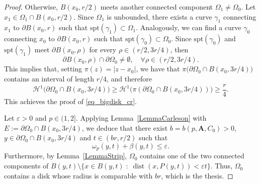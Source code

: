 \documentclass[12pt]{article}
\theoremstyle{definition}
\theoremstyle{remark}
\numberwithin{equation}{section}
\DeclareMathOperator{\dist}{dist}
\newcommand{\dd}{\partial}
\newcommand{\A}{\mathbf{A}}
\newcommand{\spt}{\mathrm{spt}}
\renewcommand{\H}{\mathcal{H}}
\begin{document}
\begin{proof}
    Otherwise, $B(x_0,r/2)$ meets another connected component $\Omega_1\neq\Omega_0$. Let $x_1\in\Omega_1\cap
    B(x_0,r/2)$. Since $\Omega_1$ is unbounded, there exists a curve $\gamma_1$ connecting $x_1$ to $\dd
    B(x_0,r)$ such that $\spt(\gamma_1) \subset \Omega_1$. Analogously, we can find a curve $\gamma_0$ connecting $x_0$
    to $\dd B(x_0,r)$ such that $\spt(\gamma_0) \subset\Omega_0$. Since $\spt(\gamma_0)$ and $\spt(\gamma_1)$ meet $\partial
    B(x_0,\rho)$ for every $\rho\in (r/2, 3r/4)$, then 
    \begin{equation}
        \dd B(x_0,\rho) \cap \dd \Omega_0 \neq \emptyset,\quad \forall\rho\in (r/2,3r/4).
    \end{equation}
    This implies that, setting $\pi(z)=|z-x_0|$, we have that $\pi\bigl(\dd\Omega_0\cap B(x_0,3r/4) \bigr)$
    contains an interval of length $r/4$, and therefore
    \begin{equation}
        \H^1\bigl(\dd\Omega_0\cap B(x_0,3r/4)\bigr)\geq \H^1\bigl(\pi(\dd\Omega_0\cap B(x_0,3r/4))\bigr)\geq\frac{r}{4}.
    \end{equation}
    This achieves the proof of \eqref{eq_bigdisk_cr}.

    Let $\varepsilon>0$ and $p\in(1,2]$. Applying Lemma~\ref{LemmaCarleson} with $E := \dd \Omega_0 \cap
    B(x_0,3r/4)$, we deduce that there exist $b=b(p,\A,C_0)>0$, $y\in \dd\Omega_0\cap B(x_0,3r/4)$ and $t\in
    (br,r/2)$ such that
    \begin{equation}
        \omega_p(y,t)+\beta(y,t) \leq \varepsilon.
    \end{equation}
    Furthermore, by Lemma~\ref{LemmaStrip}, $\Omega_0$ contains one of the two connected components of
    $B(y,t)\setminus \{x\in B(y,t) \;:\; \dist(x,P(y,t))<\varepsilon t\}$. Thus, $\Omega_0$ contains a disk whose
    radius is comparable with $br$, which is the thesis.
\end{proof}
\end{document}
